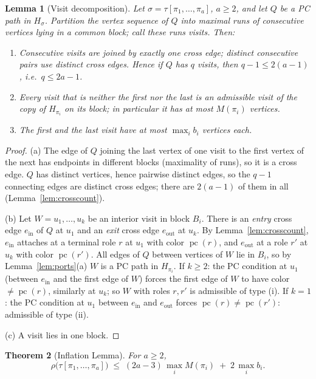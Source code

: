 \documentclass[11pt]{article}
\newtheorem{theorem}{Theorem}[section]
\newtheorem{lemma}[theorem]{Lemma}
\theoremstyle{definition}
\DeclareMathOperator{\pc}{pc}
\begin{document}
\begin{lemma}[Visit decomposition]\label{lem:visits}
Let $\sigma = \tau[\pi_1, \dots, \pi_a]$, $a \ge 2$, and let $Q$ be a PC path in
$H_\sigma$. Partition the vertex sequence of $Q$ into maximal runs of consecutive
vertices lying in a common block; call these runs \emph{visits}. Then:
\begin{enumerate}
\item[(a)] Consecutive visits are joined by exactly one cross edge; distinct
consecutive pairs use distinct cross edges. Hence if $Q$ has $q$ visits, then
$q - 1 \le 2(a-1)$, i.e.\ $q \le 2a - 1$.
\item[(b)] Every visit that is neither the first nor the last is an admissible visit of
the copy of $H_{\pi_i}$ on its block; in particular it has at most $M(\pi_i)$ vertices.
\item[(c)] The first and the last visit have at most $\max_i b_i$ vertices each.
\end{enumerate}
\end{lemma}

\begin{proof}
(a) The edge of $Q$ joining the last vertex of one visit to the first vertex of the
next has endpoints in different blocks (maximality of runs), so it is a cross edge. $Q$
has distinct vertices, hence pairwise distinct edges, so the $q-1$ connecting edges are
distinct cross edges; there are $2(a-1)$ of them in all (Lemma~\ref{lem:crosscount}).

(b) Let $W = u_1, \dots, u_k$ be an interior visit in block $B_i$. There is an
\emph{entry} cross edge $e_{\mathrm{in}}$ of $Q$ at $u_1$ and an \emph{exit} cross edge
$e_{\mathrm{out}}$ at $u_k$. By Lemma~\ref{lem:crosscount}, $e_{\mathrm{in}}$ attaches
at a terminal role $r$ at $u_1$ with color $\pc(r)$, and $e_{\mathrm{out}}$ at a role
$r'$ at $u_k$ with color $\pc(r')$. All edges of $Q$ between vertices of $W$ lie in
$B_i$, so by Lemma~\ref{lem:ports}(a) $W$ is a PC path in $H_{\pi_i}$. If $k \ge 2$:
the PC condition at $u_1$ (between $e_{\mathrm{in}}$ and the first edge of $W$) forces
the first edge of $W$ to have color $\ne \pc(r)$, similarly at $u_k$; so $W$ with roles
$r,r'$ is admissible of type (i). If $k = 1$: the PC condition at $u_1$ between
$e_{\mathrm{in}}$ and $e_{\mathrm{out}}$ forces $\pc(r) \ne \pc(r')$: admissible of
type (ii).

(c) A visit lies in one block.
\end{proof}

\begin{theorem}[Inflation Lemma]\label{thm:inflation}
For $a \ge 2$,
\[
\rho\bigl(\tau[\pi_1, \dots, \pi_a]\bigr)
\;\le\;
(2a - 3)\,\max_i M(\pi_i) \;+\; 2\,\max_i b_i .
\]
\end{theorem}
\end{document}
